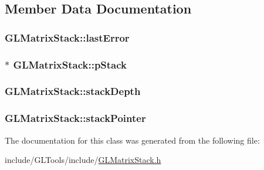 \subsection{Member Data Documentation}
\hypertarget{class_g_l_matrix_stack_af7a3a48138f5b107d691c94b69170f51}{
\subsubsection[{last\-Error}]{ G\-L\-Matrix\-Stack\-::last\-Error\hspace{0.3cm}{\ttfamily [protected]}}}\label{class_g_l_matrix_stack_af7a3a48138f5b107d691c94b69170f51}
\hypertarget{class_g_l_matrix_stack_a8af28fab6c321b55a42a34d4e62a6625}{
\subsubsection[{p\-Stack}]{$\ast$ G\-L\-Matrix\-Stack\-::p\-Stack\hspace{0.3cm}{\ttfamily [protected]}}}\label{class_g_l_matrix_stack_a8af28fab6c321b55a42a34d4e62a6625}
\hypertarget{class_g_l_matrix_stack_a9e4768a64c7eabb09a697c5c2de5c4aa}{
\subsubsection[{stack\-Depth}]{ G\-L\-Matrix\-Stack\-::stack\-Depth\hspace{0.3cm}{\ttfamily [protected]}}}\label{class_g_l_matrix_stack_a9e4768a64c7eabb09a697c5c2de5c4aa}
\hypertarget{class_g_l_matrix_stack_a535164ed27e10945beff28eaf0ad4a6f}{
\subsubsection[{stack\-Pointer}]{ G\-L\-Matrix\-Stack\-::stack\-Pointer\hspace{0.3cm}{\ttfamily [protected]}}}\label{class_g_l_matrix_stack_a535164ed27e10945beff28eaf0ad4a6f}


The documentation for this class was generated from the following file\-:\begin{DoxyCompactItemize}
\item 
include/\-G\-L\-Tools/include/\hyperlink{_g_l_matrix_stack_8h}{G\-L\-Matrix\-Stack.\-h}\end{DoxyCompactItemize}
